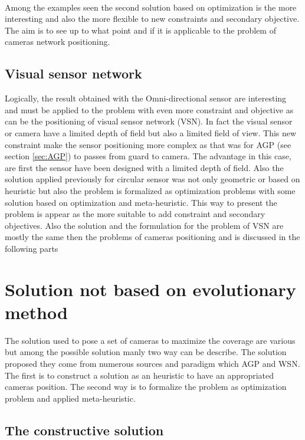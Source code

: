 \begin{itemize}
\\
\end{itemize}

Among the examples seen the second solution based on optimization is the more interesting and also the more flexible to new constraints and secondary objective. The aim is to see up to what point and if it is applicable to the problem of cameras network positioning.  

	\subsection{Visual sensor network}
	
Logically, the result obtained with the Omni-directional sensor are interesting and  must be applied to the problem with even more constraint and objective as can be the  positioning of visual sensor network (VSN).  In fact the visual sensor or camera have a limited depth of field but also a limited field of view. This new constraint make the sensor positioning more complex as that was for AGP (see section \ref{sec:AGP}) to passes from guard to camera. The advantage in this case,  are first the sensor have been designed with a limited depth of field. Also the solution applied previously for circular sensor was not only geometric or based on heuristic but also the problem is formalized as optimization problems with some solution based on optimization and meta-heuristic. This way to present the problem is appear as the more suitable to add constraint and secondary objectives. Also the solution and the formulation for the problem of VSN are mostly the same then the problems of cameras positioning and is  discussed in the following parts  \\
  

	\section{Solution not based on evolutionary method}
	
The solution used to pose a set of cameras to maximize the coverage are various but  among the possible solution manly two way can be describe. The solution proposed they come from numerous sources and paradigm  which AGP and WSN.\\
 The first is to construct a solution as an heuristic to have an appropriated cameras position. The second way is to formalize the problem as optimization problem and applied meta-heuristic. 

\subsection{The constructive solution}

